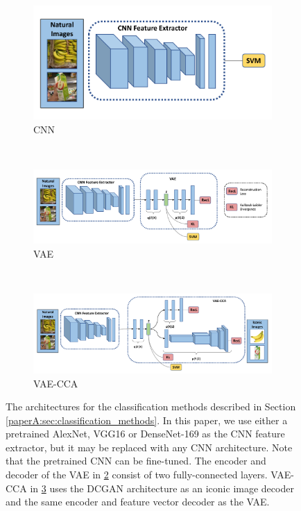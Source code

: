 \begin{figure}[t]
	\centering
	\begin{subfigure}[b]{0.35\textwidth}
		\centering
		\includegraphics[width=\textwidth]{PaperA/figures/cnn.pdf}
		\caption{CNN}
		\label{subfig:cnn}
	\end{subfigure} ~
	\begin{subfigure}[b]{0.6\textwidth}
		\centering
		\includegraphics[width=\textwidth]{PaperA/figures/cnn+vae.pdf}
		\caption{VAE}
		\label{subfig:cnn+vae}
	\end{subfigure} \\
	\begin{subfigure}[b]{0.7\textwidth}
		\centering
		\includegraphics[width=\textwidth]{PaperA/figures/vae-cca.pdf}
		\caption{VAE-CCA}
		\label{subfig:vae-cca}
	\end{subfigure}
	\vspace{-2mm}
	\caption{The architectures for the classification methods described in Section \ref{paperA:sec:classification_methods}. In this paper, we use either a pretrained AlexNet, VGG16 or DenseNet-169 as the CNN feature extractor, but it may be replaced with any CNN architecture. Note that the pretrained CNN can be fine-tuned. The encoder and decoder of the VAE in \ref{subfig:cnn+vae} consist of two fully-connected layers. VAE-CCA in \ref{subfig:vae-cca} uses the DCGAN architecture as an iconic image decoder and the same encoder and feature vector decoder as the VAE.   }
	\label{fig:classification-methods}
	\vspace{-3mm}
\end{figure}

